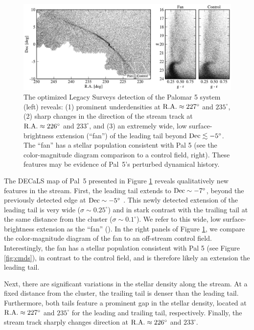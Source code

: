 \documentclass[twocolumn]{aastex62}
\newcommand{\sa}[1]{{\color{magenta} SP: #1}}
\begin{document}
\begin{figure}
\begin{center}
\includegraphics[width=\textwidth]{map_fancmd.pdf}
\end{center}
\caption{
The optimized Legacy Surveys detection of the Palomar 5 system (left) reveals: (1) prominent underdensities at $\rm R.A.\approx 227^\circ$ and $235^\circ$, (2) sharp changes in the direction of the stream track at $\rm R.A.\approx 226^\circ$ and $233^\circ$, and (3) an extremely wide, low surface-brightness extension (``fan'') of the leading tail beyond $\rm Dec\lesssim-5^\circ$. The ``fan''  has a stellar population consistent with Pal 5 (see the color-magnitude diagram comparison to a control field, right).
These features may be evidence of Pal~5's perturbed dynamical history.
}
\label{fig:map}
\end{figure}

The DECaLS map of Pal~5 presented in Figure \ref{fig:map} reveals qualitatively new features in the stream.
First, the leading tail extends to $\rm Dec\sim-7^\circ$, beyond the previously detected edge at $\rm Dec\sim -5^\circ$ \citep{Bernard:2016}.
This newly detected extension of the leading tail is very wide ($\sigma\sim 0.25^\circ$) and in stark contrast with the trailing tail at the same distance from the cluster ($\sigma\sim 0.1^\circ$). We refer to this wide, low surface-brightness extension as the ``fan'' (\citealt{Pearson:2015}). In the right panels of Figure \ref{fig:map}, we compare the color-magnitude diagram of the fan to an off-stream control field. Interestingly, the fan has a stellar population consistent with Pal 5 (see Figure \ref{fig:cmds}), in contrast to the control field, and is therefore likely an extension the leading tail. 

Next, there are significant variations in the stellar density along the stream.
At a fixed distance from the cluster, the trailing tail is denser than the leading tail.
Furthermore, both tails feature a prominent gap in the stellar density, located at $\rm R.A.\approx 227^\circ$ and $235^\circ$ for the leading and trailing tail, respectively.
Finally, the stream track sharply changes direction at $\rm R.A.\approx 226^\circ$ and $233^\circ$.
\end{document}
